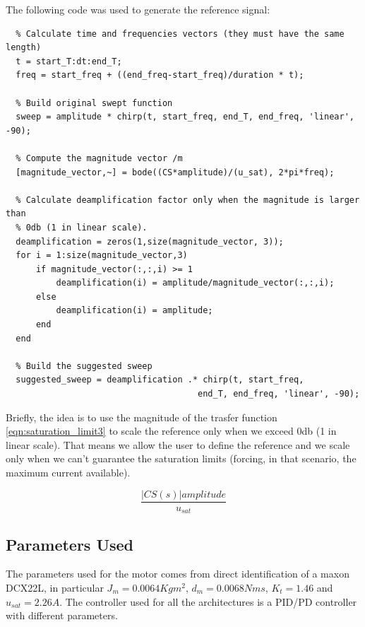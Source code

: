 \documentclass[a4paper,11pt]{article}
\begin{document}
\noindent The following code was used to generate the reference signal:

\bigskip
\begin{lstlisting}
  % Calculate time and frequencies vectors (they must have the same length)
  t = start_T:dt:end_T;
  freq = start_freq + ((end_freq-start_freq)/duration * t);
  
  % Build original swept function
  sweep = amplitude * chirp(t, start_freq, end_T, end_freq, 'linear', -90);
  
  % Compute the magnitude vector /m
  [magnitude_vector,~] = bode((CS*amplitude)/(u_sat), 2*pi*freq);
  
  % Calculate deamplification factor only when the magnitude is larger than
  % 0db (1 in linear scale).
  deamplification = zeros(1,size(magnitude_vector, 3));
  for i = 1:size(magnitude_vector,3)
      if magnitude_vector(:,:,i) >= 1 
          deamplification(i) = amplitude/magnitude_vector(:,:,i);
      else
          deamplification(i) = amplitude;
      end
  end
  
  % Build the suggested sweep
  suggested_sweep = deamplification .* chirp(t, start_freq,
                                      end_T, end_freq, 'linear', -90);
\end{lstlisting}

\smallskip
\noindent Briefly, the idea is to use the magnitude of the trasfer function \eqref{eqn:saturation_limit3} to scale the reference only when we exceed 0db (1 in linear scale). That means we allow the user to define the reference and we scale only when we can't guarantee the saturation limits (forcing, in that scenario, the maximum current available).

\smallskip
\begin{equation}
  \frac{|CS(s)|amplitude}{u_{sat}} 
  \label{eqn:saturation_limit3}
\end{equation}

\newpage

\subsection{Parameters Used}

\bigskip
The parameters used for the motor comes from direct identification of a maxon DCX22L, in particular $J_m = 0.0064Kgm^2$, $d_m = 0.0068Nms$, $K_t = 1.46$ and $u_{sat} = 2.26A$. The controller used for all the architectures is a PID/PD controller with different parameters.

\bigskip
\end{document}
